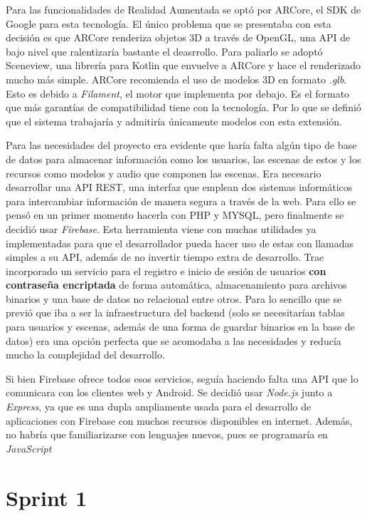 Para las funcionalidades de Realidad Aumentada se optó por ARCore\cite{arcore}, el SDK de Google para esta tecnología. El único problema que se presentaba con esta decisión es que ARCore renderiza objetos 3D a través de OpenGL, una API de bajo nivel que ralentizaría bastante el deasrrollo. Para paliarlo se adoptó Sceneview\cite{sceneview}, una librería para Kotlin que envuelve a ARCore y hace el renderizado mucho más simple. ARCore recomienda el uso de modelos 3D en formato \textit{.glb}. Esto es debido a \textit{Filament}\cite{filament}, el motor que implementa por debajo. Es el formato que más garantías de compatibilidad tiene con la tecnología. Por lo que se definió que el sistema trabajaría y admitiría únicamente modelos con esta extensión.

Para las necesidades del proyecto era evidente que haría falta algún tipo de base de datos para almacenar información como los usuarios, las escenas de estos y los recursos como modelos y audio que componen las escenas. Era necesario desarrollar una API REST, una interfaz que emplean dos sistemas informáticos para intercambiar información de manera segura a través de la web. Para ello se pensó en un primer momento hacerla con PHP y MYSQL, pero finalmente se decidió usar \textit{Firebase}\cite{firebase}. Esta herramienta viene con muchas utilidades ya implementadas para que el desarrollador pueda hacer uso de estas con llamadas simples a su API, además de no invertir tiempo extra de desarrollo. Trae incorporado un servicio para el registro e inicio de sesión de usuarios \textbf{con contraseña encriptada} de forma automática, almacenamiento para archivos binarios y una base de datos no relacional entre otros. Para lo sencillo que se previó que iba a ser la infraestructura del backend (solo se necesitarían tablas para usuarios y escenas, además de una forma de guardar binarios en la base de datos) era una opción perfecta que se acomodaba a las necesidades y reducía mucho la complejidad del desarrollo.

Si bien Firebase ofrece todos esos servicios, seguía haciendo falta una API que lo comunicara con los clientes web y Android. Se decidió usar \textit{Node.js}\cite{nodejs} junto a \textit{Express}\cite{express}, ya que es una dupla ampliamente usada para el desarrollo de aplicaciones con Firebase con muchos recursos disponibles en internet. Además, no habría que familiarizarse con lenguajes nuevos, pues se programaría en \textit{JavaScript}

\section{Sprint 1}

